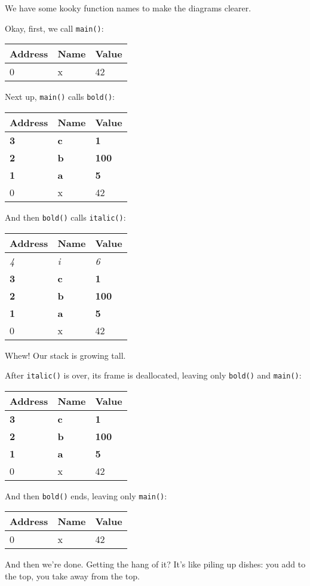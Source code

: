 \documentclass[a4paper,]{book}
\begin{document}
We have some kooky function names to make the diagrams clearer.

Okay, first, we call \texttt{main()}:

\begin{longtable}[c]{@{}lll@{}}
\toprule
Address & Name & Value\tabularnewline
\midrule
\endhead
0 & x & 42\tabularnewline
\bottomrule
\end{longtable}

Next up, \texttt{main()} calls \texttt{bold()}:

\begin{longtable}[c]{@{}lll@{}}
\toprule
Address & Name & Value\tabularnewline
\midrule
\endhead
\textbf{3} & \textbf{c} & \textbf{1}\tabularnewline
\textbf{2} & \textbf{b} & \textbf{100}\tabularnewline
\textbf{1} & \textbf{a} & \textbf{5}\tabularnewline
0 & x & 42\tabularnewline
\bottomrule
\end{longtable}

And then \texttt{bold()} calls \texttt{italic()}:

\begin{longtable}[c]{@{}lll@{}}
\toprule
Address & Name & Value\tabularnewline
\midrule
\endhead
\emph{4} & \emph{i} & \emph{6}\tabularnewline
\textbf{3} & \textbf{c} & \textbf{1}\tabularnewline
\textbf{2} & \textbf{b} & \textbf{100}\tabularnewline
\textbf{1} & \textbf{a} & \textbf{5}\tabularnewline
0 & x & 42\tabularnewline
\bottomrule
\end{longtable}

Whew! Our stack is growing tall.

After \texttt{italic()} is over, its frame is deallocated, leaving only
\texttt{bold()} and \texttt{main()}:

\begin{longtable}[c]{@{}lll@{}}
\toprule
Address & Name & Value\tabularnewline
\midrule
\endhead
\textbf{3} & \textbf{c} & \textbf{1}\tabularnewline
\textbf{2} & \textbf{b} & \textbf{100}\tabularnewline
\textbf{1} & \textbf{a} & \textbf{5}\tabularnewline
0 & x & 42\tabularnewline
\bottomrule
\end{longtable}

And then \texttt{bold()} ends, leaving only \texttt{main()}:

\begin{longtable}[c]{@{}lll@{}}
\toprule
Address & Name & Value\tabularnewline
\midrule
\endhead
0 & x & 42\tabularnewline
\bottomrule
\end{longtable}

And then we're done. Getting the hang of it? It's like piling up dishes:
you add to the top, you take away from the top.
\end{document}
